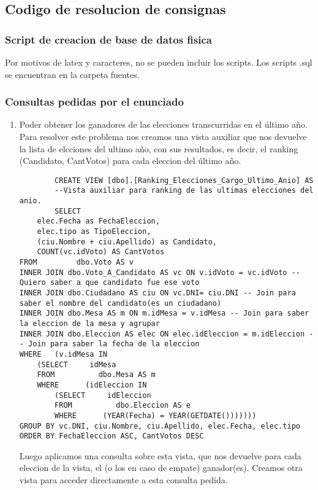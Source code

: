 \subsection{Codigo de resolucion de consignas}
\subsubsection{Script de creacion de base de datos fisica}
Por motivos de latex y caracteres, no se pueden incluir los scripts. Los scripts .sql se encuentran en la carpeta fuentes.

\subsubsection{Consultas pedidas por el enunciado}
\begin{enumerate}
	\item Poder obtener los ganadores de las elecciones transcurridas en el último año.
		Para resolver este problema nos creamos una vista auxiliar que nos devuelve la lista de elcciones del ultimo a\~no, 
		con sus resultados, es decir, el ranking (Candidato, CantVotos) para cada eleccion del último año.

		\begin{lstlisting}
		CREATE VIEW [dbo].[Ranking_Elecciones_Cargo_Ultimo_Anio] AS
		--Vista auxiliar para ranking de las ultimas elecciones del anio.
		SELECT 
	elec.Fecha as FechaEleccion, 
	elec.tipo as TipoEleccion,
	(ciu.Nombre + ciu.Apellido) as Candidato, 
	COUNT(vc.idVoto) AS CantVotos
FROM         dbo.Voto AS v 
INNER JOIN dbo.Voto_A_Candidato AS vc ON v.idVoto = vc.idVoto -- Quiero saber a que candidato fue ese voto
INNER JOIN dbo.Ciudadano AS ciu ON vc.DNI= ciu.DNI -- Join para saber el nombre del candidato(es un ciudadano)
INNER JOIN dbo.Mesa AS m ON m.idMesa = v.idMesa -- Join para saber la eleccion de la mesa y agrupar
INNER JOIN dbo.Eleccion AS elec ON elec.idEleccion = m.idEleccion -- Join para saber la fecha de la eleccion
WHERE	(v.idMesa IN
	(SELECT     idMesa
	FROM          dbo.Mesa AS m
	WHERE      (idEleccion IN
		(SELECT     idEleccion
		FROM          dbo.Eleccion AS e
		WHERE      (YEAR(Fecha) = YEAR(GETDATE()))))))
GROUP BY vc.DNI, ciu.Nombre, ciu.Apellido, elec.Fecha, elec.tipo
ORDER BY FechaEleccion ASC, CantVotos DESC

		\end{lstlisting}
		
	Luego aplicamos una consulta sobre esta vista, que nos devuelve para cada eleccion de la vista, el (o los en caso de empate) ganador(es).
	Creamos otra vista para acceder directamente a esta consulta pedida.
		

\end{enumerate}
